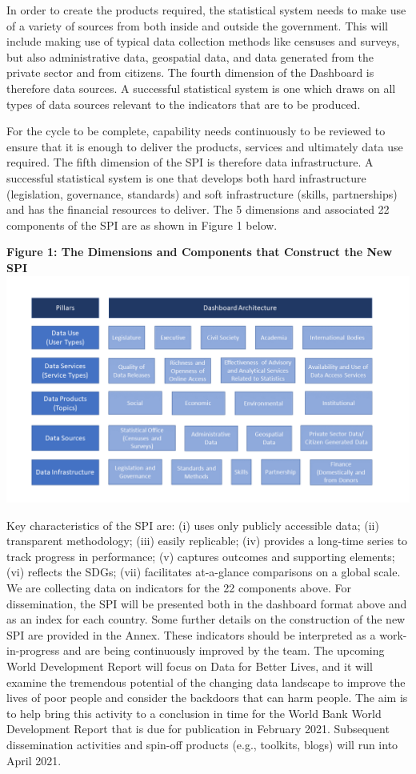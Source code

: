\documentclass[
]{article}
\begin{document}
In order to create the products required, the statistical system needs
to make use of a variety of sources from both inside and outside the
government. This will include making use of typical data collection
methods like censuses and surveys, but also administrative data,
geospatial data, and data generated from the private sector and from
citizens. The fourth dimension of the Dashboard is therefore data
sources. A successful statistical system is one which draws on all types
of data sources relevant to the indicators that are to be produced.

For the cycle to be complete, capability needs continuously to be
reviewed to ensure that it is enough to deliver the products, services
and ultimately data use required. The fifth dimension of the SPI is
therefore data infrastructure. A successful statistical system is one
that develops both hard infrastructure (legislation, governance,
standards) and soft infrastructure (skills, partnerships) and has the
financial resources to deliver. The 5 dimensions and associated 22
components of the SPI are as shown in Figure 1 below.

\textbf{Figure 1: The Dimensions and Components that Construct the New
SPI} \includegraphics{SPI_dashboard.png}

Key characteristics of the SPI are: (i) uses only publicly accessible
data; (ii) transparent methodology; (iii) easily replicable; (iv)
provides a long-time series to track progress in performance; (v)
captures outcomes and supporting elements; (vi) reflects the SDGs; (vii)
facilitates at-a-glance comparisons on a global scale. We are collecting
data on indicators for the 22 components above. For dissemination, the
SPI will be presented both in the dashboard format above and as an index
for each country. Some further details on the construction of the new
SPI are provided in the Annex. These indicators should be interpreted as
a work-in-progress and are being continuously improved by the team. The
upcoming World Development Report will focus on Data for Better Lives,
and it will examine the tremendous potential of the changing data
landscape to improve the lives of poor people and consider the backdoors
that can harm people. The aim is to help bring this activity to a
conclusion in time for the World Bank World Development Report that is
due for publication in February 2021. Subsequent dissemination
activities and spin-off products (e.g., toolkits, blogs) will run into
April 2021.
\end{document}
